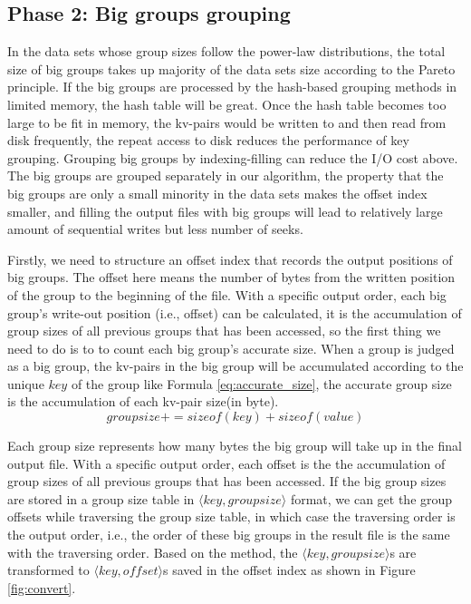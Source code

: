 \subsection{Phase 2: Big groups grouping}

In the data sets whose group sizes follow the power-law distributions, the total size of big groups takes up majority of the data sets size according to the Pareto principle. If the big groups are processed by the hash-based grouping methods in limited memory, the hash table will be great. Once the hash table becomes too large to be fit in memory, the kv-pairs would be written to and then read from disk frequently, the repeat access to disk reduces the performance of key grouping. Grouping big groups by indexing-filling can reduce the I/O cost above. The big groups are grouped separately in our algorithm, the property that the big groups are only a small minority in the data sets makes the offset index smaller, and filling the output files with big groups will lead to relatively large amount of sequential writes but less number of seeks.

Firstly, we need to structure an offset index that records the output positions of big groups. The offset here means the number of bytes from the written position of the group to the beginning of the file. With a specific output order, each big group's write-out position (i.e., offset) can be calculated, it is the accumulation of group sizes of all previous groups that has been accessed, so the first thing we need to do is to to count each big group's accurate size. When a group is judged as a big group, the kv-pairs in the big group will be accumulated according to the unique $key$ of the group like Formula \ref{eq:accurate_size}, the accurate group size is the accumulation of each kv-pair size(in byte).
\begin{equation}\label{eq:accurate_size}
    groupsize += sizeof(key) + sizeof(value)
\end{equation}

Each group size represents how many bytes the big group will take up in the final output file. With a specific output order, each offset is the
the accumulation of group sizes of all previous groups that has been accessed. If the big group sizes are stored in a group size table in $\langle key, groupsize\rangle$ format, we can get the group offsets while traversing the group size table, in which case the traversing order is the output order, i.e., the order of these big groups in the result file is the same with the traversing order. Based on the method, the $\langle key, groupsize\rangle$s are transformed to $\langle key, offset\rangle$s saved in the offset index as shown in Figure \ref{fig:convert}.

